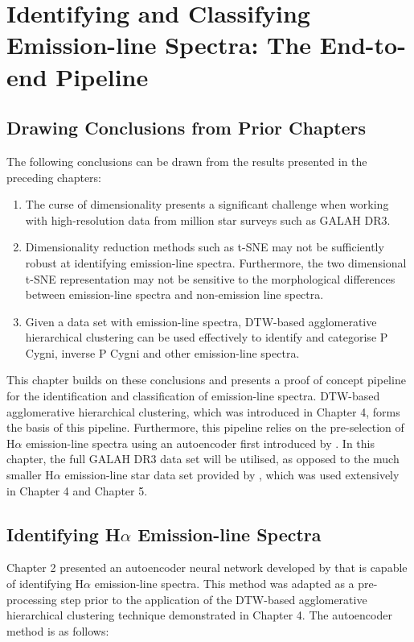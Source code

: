 \chapter{Identifying and Classifying Emission-line Spectra: The End-to-end Pipeline}

\section{Drawing Conclusions from Prior Chapters}

The following conclusions can be drawn from the results presented in the preceding chapters:

\begin{enumerate}
    \item The curse of dimensionality presents a significant challenge when working with high-resolution data from million star surveys such as GALAH DR3. 
    \item Dimensionality reduction methods such as t-SNE may not be sufficiently robust at identifying emission-line spectra. Furthermore, the two dimensional t-SNE representation may not be sensitive to the morphological differences between emission-line spectra and non-emission line spectra.
    \item Given a data set with emission-line spectra, DTW-based agglomerative hierarchical clustering can be used effectively to identify and categorise P Cygni, inverse P Cygni and other emission-line spectra.
\end{enumerate}

This chapter builds on these conclusions and presents a proof of concept pipeline for the identification and classification of emission-line spectra. DTW-based agglomerative hierarchical clustering, which  was introduced in Chapter 4, forms the basis of this pipeline. Furthermore, this pipeline relies on the pre-selection of H$\alpha$ emission-line spectra using an autoencoder first introduced by \citet{vcotar2021galah}. In this chapter, the full GALAH DR3 data set will be utilised, as opposed to the much smaller H$\alpha$ emission-line star data set provided by \citet{vcotar2021galah}, which was used extensively in Chapter 4 and Chapter 5.

\section{Identifying H$\alpha$ Emission-line Spectra}

Chapter 2 presented an autoencoder neural network developed by \citet{vcotar2021galah} that is capable of identifying H$\alpha$ emission-line spectra. This method was adapted as a pre-processing step prior to the application of the DTW-based agglomerative hierarchical clustering technique demonstrated in Chapter 4. The autoencoder method is as follows:

